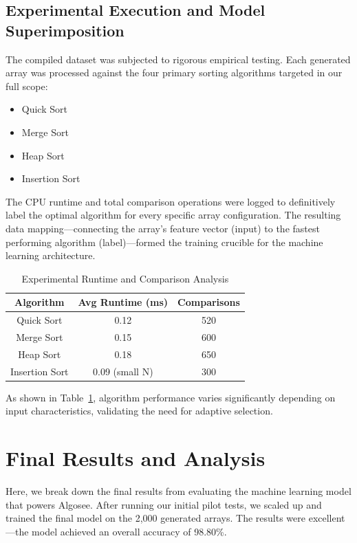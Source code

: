 \documentclass[12pt,a4paper,oneside,openany]{report}
\begin{document}
\section{Experimental Execution and Model Superimposition}
The compiled dataset was subjected to rigorous empirical testing. Each generated array was processed against the four primary sorting algorithms targeted in our full scope:
\begin{itemize}
    \item Quick Sort
    \item Merge Sort
    \item Heap Sort
    \item Insertion Sort
\end{itemize}
The CPU runtime and total comparison operations were logged to definitively label the optimal algorithm for every specific array configuration. The resulting data mapping---connecting the array's feature vector (input) to the fastest performing algorithm (label)---formed the training crucible for the machine learning architecture.

\begin{table}[H]
\centering
\begin{tabular}{ccc}
\toprule
\textbf{Algorithm} & \textbf{Avg Runtime (ms)} & \textbf{Comparisons} \\
\midrule
Quick Sort & 0.12 & 520 \\
Merge Sort & 0.15 & 600 \\
Heap Sort & 0.18 & 650 \\
Insertion Sort & 0.09 (small N) & 300 \\
\bottomrule
\end{tabular}
\caption{Experimental Runtime and Comparison Analysis}
\label{tab:runtime}
As shown in Table~\ref{tab:runtime}, algorithm performance varies significantly depending on input characteristics, validating the need for adaptive selection.
\end{table}




\chapter{Final Results and Analysis}
Here, we break down the final results from evaluating the machine learning model that powers Algosee. After running our initial pilot tests, we scaled up and trained the final model on the 2,000 generated arrays. The results were excellent—the model achieved an overall accuracy of 98.80\%.
\end{document}
